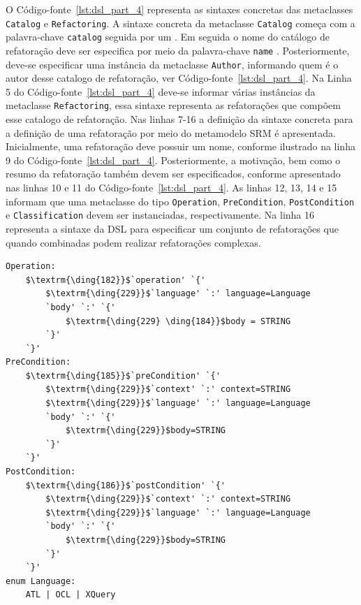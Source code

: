 O Código-fonte~\ref{lst:dsl_part_4} representa as sintaxes concretas das metaclasses \texttt{Catalog} e \texttt{Refactoring}. A sintaxe concreta da metaclasse \texttt{Catalog} começa com a palavra-chave \texttt{catalog} seguida por um \aspas{\{}. Em seguida o nome do catálogo de refatoração deve ser especifica por meio da palavra-chave \texttt{name} . Posteriormente, deve-se especificar uma instância da metaclasse \texttt{Author}, informando quem é o autor desse catalogo de refatoração, ver Código-fonte~\ref{lst:dsl_part_4}. Na Linha 5 do Código-fonte~\ref{lst:dsl_part_4} deve-se informar várias instâncias da metaclasse \texttt{Refactoring}, essa sintaxe representa as refatorações que compõem esse catalogo de refatoração. Nas linhas 7-16 a definição da sintaxe concreta para a definição de uma refatoração por meio do metamodelo SRM é apresentada. Inicialmente, uma refatoração deve possuir um nome, conforme ilustrado na linha 9 do Código-fonte~\ref{lst:dsl_part_4}. Posteriormente, a motivação, bem como o resumo da refatoração também devem ser especificados, conforme apresentado nas linhas 10 e 11 do Código-fonte~\ref{lst:dsl_part_4}. As linhas 12, 13, 14 e 15 informam que uma metaclasse do tipo \texttt{Operation}, \texttt{PreCondition}, \texttt{PostCondition} e \texttt{Classification}  devem ser instanciadas, respectivamente. Na linha 16 representa a sintaxe da DSL para especificar um conjunto de refatorações que quando combinadas podem realizar refatorações complexas.

\begin{lstlisting}[language=Xtext, frame=single, basicstyle=\scriptsize, mathescape=true, label={lst:dsl_part_5}, caption={Gramática da DSL - parte 5}]
Operation: 
	$\textrm{\ding{182}}$`operation' `{'
		$\textrm{\ding{229}}$`language' `:' language=Language
		`body' `:' `{'
			$\textrm{\ding{229} \ding{184}}$body = STRING
		`}'
	`}'
PreCondition: 
	$\textrm{\ding{185}}$`preCondition' `{'
		$\textrm{\ding{229}}$`context' `:' context=STRING
		$\textrm{\ding{229}}$`language' `:' language=Language
		`body' `:' `{' 
			$\textrm{\ding{229}}$body=STRING	
		`}'
	`}'
PostCondition: 
	$\textrm{\ding{186}}$`postCondition' `{'
		$\textrm{\ding{229}}$`context' `:' context=STRING
		$\textrm{\ding{229}}$`language' `:' language=Language
		`body' `:' `{' 
			$\textrm{\ding{229}}$body=STRING	
		`}'
	`}'
enum Language: 
	ATL | OCL | XQuery
\end{lstlisting}

